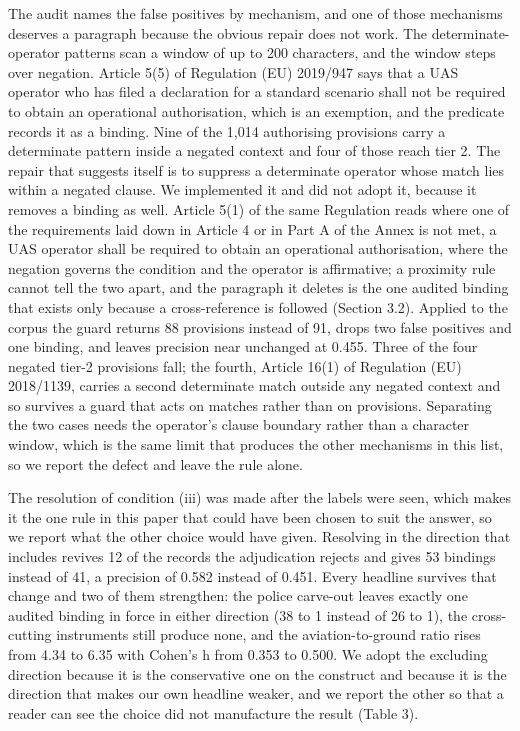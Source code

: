 The audit names the false positives by mechanism, and one of those mechanisms deserves a paragraph because the obvious repair does not work. The determinate-operator patterns scan a window of up to 200 characters, and the window steps over negation. Article 5(5) of Regulation (EU) 2019/947 says that a UAS operator who has filed a declaration for a standard scenario shall not be required to obtain an operational authorisation, which is an exemption, and the predicate records it as a binding. Nine of the 1,014 authorising provisions carry a determinate pattern inside a negated context and four of those reach tier 2. The repair that suggests itself is to suppress a determinate operator whose match lies within a negated clause. We implemented it and did not adopt it, because it removes a binding as well. Article 5(1) of the same Regulation reads where one of the requirements laid down in Article 4 or in Part A of the Annex is not met, a UAS operator shall be required to obtain an operational authorisation, where the negation governs the condition and the operator is affirmative; a proximity rule cannot tell the two apart, and the paragraph it deletes is the one audited binding that exists only because a cross-reference is followed (Section 3.2). Applied to the corpus the guard returns 88 provisions instead of 91, drops two false positives and one binding, and leaves precision near unchanged at 0.455. Three of the four negated tier-2 provisions fall; the fourth, Article 16(1) of Regulation (EU) 2018/1139, carries a second determinate match outside any negated context and so survives a guard that acts on matches rather than on provisions. Separating the two cases needs the operator's clause boundary rather than a character window, which is the same limit that produces the other mechanisms in this list, so we report the defect and leave the rule alone.

The resolution of condition (iii) was made after the labels were seen, which makes it the one rule in this paper that could have been chosen to suit the answer, so we report what the other choice would have given. Resolving in the direction that includes revives 12 of the records the adjudication rejects and gives 53 bindings instead of 41, a precision of 0.582 instead of 0.451. Every headline survives that change and two of them strengthen: the police carve-out leaves exactly one audited binding in force in either direction (38 to 1 instead of 26 to 1), the cross-cutting instruments still produce none, and the aviation-to-ground ratio rises from 4.34 to 6.35 with Cohen's h from 0.353 to 0.500. We adopt the excluding direction because it is the conservative one on the construct and because it is the direction that makes our own headline weaker, and we report the other so that a reader can see the choice did not manufacture the result (Table 3).

